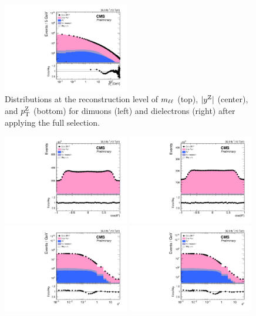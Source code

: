 \begin{figure}
	\includegraphics[width=0.49\textwidth]{figures/zpt/zee_ptll.pdf}
	\caption{Distributions at the reconstruction level of $m_{\ell\ell}$ (top), $|y^{\mathrm{Z}}|$ (center), and 
	$p_{\mathrm{T}}^{\mathrm{Z}}$ (bottom) for dimuons (left) and dielectrons (right) after applying the full selection.}
	\label{fig:recodist1}
\end{figure}

\begin{figure}
	\centering
	\includegraphics[width=0.49\textwidth]{figures/zpt/zmm_cos_theta_star.pdf}
	\includegraphics[width=0.49\textwidth]{figures/zpt/zee_cos_theta_star.pdf}
	\includegraphics[width=0.49\textwidth]{figures/zpt/zmm_phi_star.pdf}
	\includegraphics[width=0.49\textwidth]{figures/zpt/zee_phi_star.pdf}

\end{figure}
